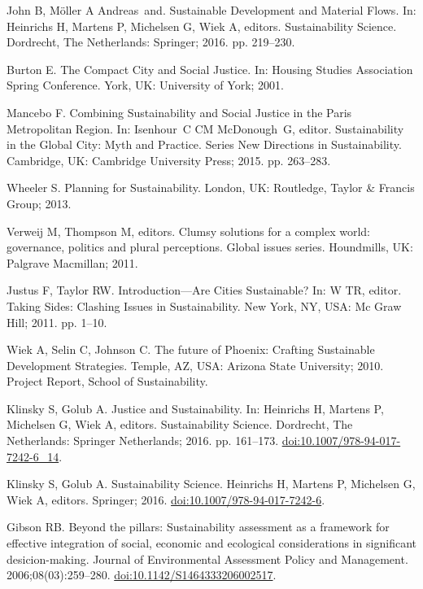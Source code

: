 \documentclass[10pt,a4paper]{article}
\begin{document}
\begin{multicols}{2}
\begin{footnotesize}
\begin{thebibliography}{100}
John B, Möller A Andreas~and.
\newblock Sustainable {Development} and {Material} {Flows}.
\newblock In: Heinrichs H, Martens P, Michelsen G, Wiek A, editors.
  Sustainability {Science}. Dordrecht, The Netherlands: Springer; 2016. pp.
  219--230.

Burton E.
\newblock The {Compact} {City} and {Social} {Justice}.
\newblock In: Housing Studies Association Spring Conference. York, UK:
  University of York; 2001.

Mancebo F.
\newblock Combining {Sustainability} and {Social} {Justice} in the {Paris}
  {Metropolitan} {Region}.
\newblock In: Isenhour~C CM McDonough~G, editor. Sustainability in the {Global}
  {City}: {Myth} and {Practice}. Series {New} {Directions} in
  {Sustainability}. Cambridge, UK: Cambridge University Press; 2015. pp.
  263--283.

Wheeler S.
\newblock Planning for Sustainability.
\newblock London, UK: Routledge, Taylor \& Francis Group; 2013.

Verweij M, Thompson M, editors.
\newblock Clumsy solutions for a complex world: governance, politics and plural
  perceptions.
\newblock Global issues series. Houndmills, UK: Palgrave Macmillan; 2011.

Justus F, Taylor RW.
\newblock Introduction---{Are} {Cities} {Sustainable}?
\newblock In: W TR, editor. Taking {Sides}: {Clashing} {Issues} in
  {Sustainability}. New York, NY, USA: Mc Graw Hill; 2011. pp. 1--10.

Wiek A, Selin C, Johnson C.
\newblock The future of {Phoenix}: {Crafting} {Sustainable} {Development}
  {Strategies}.
\newblock Temple, AZ, USA: Arizona State University; 2010. Project {Report},
  {School} of {Sustainability}.

Klinsky S, Golub A.
\newblock Justice and {Sustainability}.
\newblock In: Heinrichs H, Martens P, Michelsen G, Wiek A, editors.
  Sustainability {Science}. Dordrecht, The Netherlands: Springer Netherlands;
  2016. pp. 161--173.
\newblock
  \href{https://doi.org/10.1007/978-94-017-7242-6\_14}{doi:10.1007/978-94-017-7242-6\_14}.

Klinsky S, Golub A.
\newblock Sustainability Science.
\newblock Heinrichs H, Martens P, Michelsen G, Wiek A, editors. Springer; 2016.
\newblock
  \href{https://doi.org/10.1007/978-94-017-7242-6}{doi:10.1007/978-94-017-7242-6}.

Gibson RB.
\newblock Beyond the pillars: Sustainability assessment as a framework for
  effective integration of social, economic and ecological considerations in
  significant desicion-making.
\newblock Journal of Environmental Assessment Policy and Management.
  2006;08(03):259--280.
\newblock
  \href{https://doi.org/10.1142/S1464333206002517}{doi:10.1142/S1464333206002517}.


\end{thebibliography}
\end{footnotesize}
\end{multicols}
\end{document}
